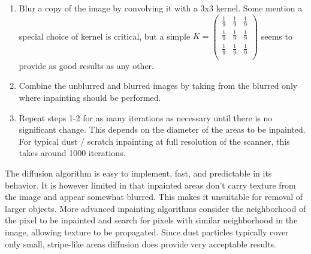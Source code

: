 \documentclass{article}
\begin{document}
\begin{enumerate}
  \item Blur a copy of the image by convolving it with a 3x3 kernel. Some mention
        a special choice of kernel is critical, but a simple
        $K = \begin{pmatrix} \frac{1}{9} & \frac{1}{9} & \frac{1}{9} \\
                            \frac{1}{9} & \frac{1}{9} & \frac{1}{9} \\
                            \frac{1}{9} & \frac{1}{9} & \frac{1}{9} \\ \end{pmatrix}$
        seems to provide as good results as any other.
  
  \item Combine the unblurred and blurred images by taking from the blurred only
        where inpainting should be performed.
        
  \item Repeat steps 1-2 for as many iterations as necessary until there is no
        significant change. This depends on the diameter of the areas to be inpainted.
        For typical dust / scratch inpainting at full resolution of the scanner,
        this takes around 1000 iterations.
\end{enumerate}

The diffusion algorithm is easy to implement, fast, and predictable in its behavior.
It is however limited in that inpainted areas don't carry texture from the image
and appear somewhat blurred. This makes it unsuitable for removal of larger objects.
More advanced inpainting algorithms consider the neighborhood of the pixel to be inpainted
and search for pixels with similar neighborhood in the image, allowing texture to be propagated.
Since dust particles typically cover only small, stripe-like areas diffusion does provide
very acceptable results.
\end{document}
